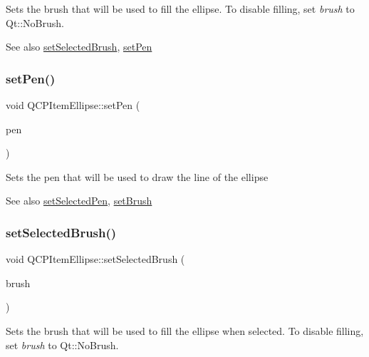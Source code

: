 Sets the brush that will be used to fill the ellipse. To disable filling, set {\itshape brush} to Qt\+::\+No\+Brush.

\begin{DoxySeeAlso}{See also}
\hyperlink{class_q_c_p_item_ellipse_a9693501cfaa43a099655c75bed0dab3f}{set\+Selected\+Brush}, \hyperlink{class_q_c_p_item_ellipse_adb81a663ed2420fcfa011e49f678d1a6}{set\+Pen} 
\end{DoxySeeAlso}
\hypertarget{class_q_c_p_item_ellipse_adb81a663ed2420fcfa011e49f678d1a6}{}\label{class_q_c_p_item_ellipse_adb81a663ed2420fcfa011e49f678d1a6} 
\subsubsection{\texorpdfstring{set\+Pen()}{setPen()}}
{\footnotesize\ttfamily void Q\+C\+P\+Item\+Ellipse\+::set\+Pen (\begin{DoxyParamCaption}\item[{const Q\+Pen \&}]{pen }\end{DoxyParamCaption})}

Sets the pen that will be used to draw the line of the ellipse

\begin{DoxySeeAlso}{See also}
\hyperlink{class_q_c_p_item_ellipse_a6c542fba1dc918041c583f58a50dde99}{set\+Selected\+Pen}, \hyperlink{class_q_c_p_item_ellipse_a49fc74e6965834e873d027d026def798}{set\+Brush} 
\end{DoxySeeAlso}
\hypertarget{class_q_c_p_item_ellipse_a9693501cfaa43a099655c75bed0dab3f}{}\label{class_q_c_p_item_ellipse_a9693501cfaa43a099655c75bed0dab3f} 
\subsubsection{\texorpdfstring{set\+Selected\+Brush()}{setSelectedBrush()}}
{\footnotesize\ttfamily void Q\+C\+P\+Item\+Ellipse\+::set\+Selected\+Brush (\begin{DoxyParamCaption}\item[{const Q\+Brush \&}]{brush }\end{DoxyParamCaption})}

Sets the brush that will be used to fill the ellipse when selected. To disable filling, set {\itshape brush} to Qt\+::\+No\+Brush.

